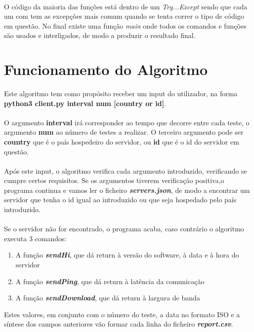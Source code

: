 \documentclass{report}
\begin{document}
\paragraph{}
O código da maioria das funções está dentro de um \textit{Try...Except} \cite{Exceptions} sendo que cada um com tem as excepções mais comum quando se tenta correr o tipo de código em questão. \newline
No final existe uma função \textit{main} onde todos os comandos e funções são usados e interligados, de modo a produzir o resultado final.

\section{Funcionamento do Algoritmo}
\paragraph{}
Este algoritmo tem como propósito receber um input do utilizador, na forma \textbf{python3 client.py interval num [country or id]}. 
\paragraph{}
O argumento \textbf{interval} irá corresponder ao tempo que decorre entre cada teste, o argumento \textbf{num} ao número de testes a realizar. O terceiro argumento pode ser \textbf{country} que é o país hospedeiro do servidor, ou \textbf{id} que é o id do servidor em questão.
\paragraph{}
Após este input, o algoritmo verifica cada argumento introduzido, verificando se cumpre certos requisitos. Se os argumentos tiverem verificação positiva,o programa continua e vamos ler o ficheiro \textbf{\textit{servers.json}}, de modo a encontrar um servidor que tenha o id igual ao introduzido ou que seja hospedado pelo país introduzido.
\paragraph{}
Se o servidor não for encontrado, o programa acaba, caso contrário o algoritmo executa 3 comandos:
\begin{enumerate}
	\item A função \textbf{\textit{sendHi}}, que dá return à versão do software, à data e à hora do servidor
    \item A função \textbf{\textit{sendPing}}, que dá return à latência da comunicação
    \item A função \textbf{\textit{sendDownload}}, que dá return à largura de banda
\end{enumerate}
Estes valores, em conjunto com o número do teste, a data no formato ISO e a síntese dos campos anteriores vão formar cada linha do ficheiro \textbf{\textit{report.csv}}.
\end{document}
